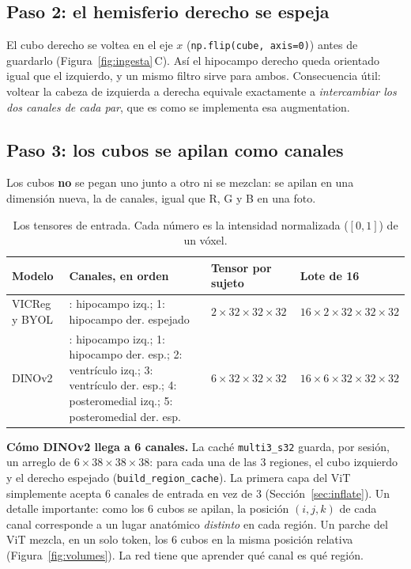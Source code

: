 \documentclass[11pt,a4paper]{article}
\begin{document}
\subsection{Paso 2: el hemisferio derecho se espeja}

El cubo derecho se voltea en el eje $x$ (\texttt{np.flip(cube, axis=0)}) antes de guardarlo
(Figura~\ref{fig:ingesta}\,C). Así el hipocampo derecho queda orientado igual que el izquierdo, y un
mismo filtro sirve para ambos. Consecuencia útil: voltear la cabeza de izquierda a derecha equivale
exactamente a \emph{intercambiar los dos canales de cada par}, que es como se implementa esa
augmentation.

\subsection{Paso 3: los cubos se apilan como canales}

Los cubos \textbf{no} se pegan uno junto a otro ni se mezclan: se apilan en una dimensión nueva, la
de canales, igual que R, G y B en una foto.

\begin{table}[H]
\centering
\small
\begin{tabularx}{\textwidth}{l>{\raggedright\arraybackslash}Xll}
\toprule
Modelo & Canales, en orden & Tensor por sujeto & Lote de 16 \\
\midrule
VICReg y BYOL & 0: hipocampo izq.; 1: hipocampo der. espejado & $2\times32\times32\times32$ & $16\times2\times32\times32\times32$ \\
DINOv2 & 0: hipocampo izq.; 1: hipocampo der. esp.; 2: ventrículo izq.; 3: ventrículo der. esp.;
  4: posteromedial izq.; 5: posteromedial der. esp. & $6\times32\times32\times32$ & $16\times6\times32\times32\times32$ \\
\bottomrule
\end{tabularx}
\caption{Los tensores de entrada. Cada número es la intensidad normalizada ($[0,1]$) de un vóxel.}
\label{tab:tensors}
\end{table}

\textbf{Cómo DINOv2 llega a 6 canales.} La caché \texttt{multi3\_s32} guarda, por sesión, un
arreglo de $6\times38\times38\times38$: para cada una de las 3 regiones, el cubo izquierdo y el
derecho espejado (\texttt{build\_region\_cache}). La primera capa del ViT simplemente acepta 6
canales de entrada en vez de 3 (Sección~\ref{sec:inflate}). Un detalle importante: como los 6
cubos se apilan, la posición $(i,j,k)$ de cada canal corresponde a un lugar anatómico
\emph{distinto} en cada región. Un parche del ViT mezcla, en un solo token, los 6 cubos en la misma
posición relativa (Figura~\ref{fig:volumes}). La red tiene que aprender qué canal es qué región.
\end{document}
